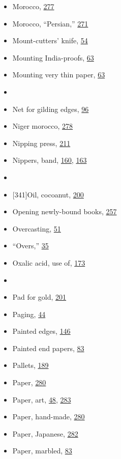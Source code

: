 \documentclass[
]{article}
\begin{document}
\begin{itemize}
\item
  Morocco, \protect\hyperlink{Page_277}{277}
\item
  Morocco, ``Persian,'' \protect\hyperlink{Page_271}{271}
\item
  Mount-cutters' knife, \protect\hyperlink{Page_54}{54}
\item
  Mounting India-proofs, \protect\hyperlink{Page_63}{63}
\item
  Mounting very thin paper, \protect\hyperlink{Page_63}{63}
\item
  ~
\item
  {Net} for gilding edges, \protect\hyperlink{Page_96}{96}
\item
  Niger morocco, \protect\hyperlink{Page_278}{278}
\item
  Nipping press, \protect\hyperlink{Page_211}{211}
\item
  Nippers, band, \protect\hyperlink{Page_160}{160},
  \protect\hyperlink{Page_163}{163}
\item
  ~
\item
  {\protect\hypertarget{Page_341}{}{{[}341{]}}}{Oil}, cocoanut,
  \protect\hyperlink{Page_200}{200}
\item
  Opening newly-bound books, \protect\hyperlink{Page_257}{257}
\item
  Overcasting, \protect\hyperlink{Page_51}{51}
\item
  ``Overs,'' \protect\hyperlink{Page_35}{35}
\item
  Oxalic acid, use of, \protect\hyperlink{Page_173}{173}
\item
  ~
\item
  {Pad} for gold, \protect\hyperlink{Page_201}{201}
\item
  Paging, \protect\hyperlink{Page_44}{44}
\item
  Painted edges, \protect\hyperlink{Page_146}{146}
\item
  Painted end papers, \protect\hyperlink{Page_83}{83}
\item
  Pallets, \protect\hyperlink{Page_189}{189}
\item
  Paper, \protect\hyperlink{Page_280}{280}
\item
  Paper, art, \protect\hyperlink{Page_48}{48},
  \protect\hyperlink{Page_283}{283}
\item
  Paper, hand-made, \protect\hyperlink{Page_280}{280}
\item
  Paper, Japanese, \protect\hyperlink{Page_282}{282}
\item
  Paper, marbled, \protect\hyperlink{Page_83}{83}

\end{itemize}
\end{document}
